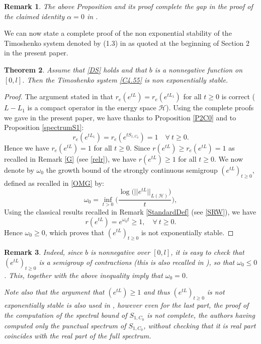 \documentclass[10pt, english]{article}
\newtheorem{thm}{Theorem}[section]
\newtheorem{oss}[thm]{Remark}
\begin{document}
{\begin{oss}\label{thmB}
The above Proposition and its proof complete the gap in the proof of the claimed identity $\alpha=0$ in \cite{SW2003}.
\end{oss}
We can now state a complete proof of the non exponential stability of the Timoshenko system denoted by (1.3) in \cite{SW2003} as quoted at the beginning of Section 2 in the present paper.
\begin{thm}\label{NES}
Assume that \eqref{DS} holds and that $b$ is a nonnegative function on $[0,l]$. Then the Timoshenko system \eqref{C4.55} is non exponentially stable.
\end{thm}
\begin{proof}
The argument stated in \cite{SW2003} that $r_e(e^{tL})=r_e(e^{tL_1})$ for all $t \geqslant 0$ is correct ($L-L_1$ is a compact operator in the energy space $\mathcal{H}$).
Using the complete proofs we gave in the present paper, we have thanks to Proposition \ref{P2C0} and to Proposition \ref{spectrumS1}:
$$
r_e(e^{tL_1})=r_e(e^{tS_{1,C_0}})=1 \quad \forall \ t \geqslant 0.
$$
Hence we have  $r_e(e^{tL})=1$ for all $ t \geqslant 0$. Since $r(e^{tL}) \geqslant r_e(e^{tL})=1$ as recalled in Remark \ref{G} (see \eqref{relr}), we have $r(e^{tL}) \geqslant 1$ for all $t \geqslant 0$.
We now denote by  $\omega_0$ the growth bound of the strongly continuous semigroup $(e^{tL})_{t \geqslant 0}$, defined as recalled in \eqref{OMG} by:
$$
\omega_0=\inf_{t>0}\Big(\dfrac{\log{\big(||e^{tL}||_{L(\mathcal{H})}\big)}}{t}\Big),
$$
Using the classical results recalled in Remark \ref{StandardDef} (see \eqref{SRW}), we have
$$
r(e^{tL})=e^{\omega_0 t} \geqslant 1, \quad \forall \ t \geqslant 0.
$$
Hence $\omega_0 \geqslant 0$, which proves that $(e^{tL})_{t \geqslant 0}$ is not exponentially stable.
\end{proof}
\begin{oss}\label{w0=0}
Indeed, since $b$ is nonnegative over $[0,l]$, it is easy to check that $(e^{tL})_{t \geqslant 0}$ is a semigroup of contractions (this is also recalled in \cite{SW2003}), so that $\omega_0 \leqslant 0$. This, together with the above inequality imply that $\omega_0 =0$.

Note also that the argument that $(e^{tL}) \geqslant 1$ and thus $(e^{tL})_{t \geqslant 0}$ is not exponentially stable is also used in \cite{SW2003}, however even for the last part, the proof of the computation of the spectral bound of $S_{1,C_0}$ is not complete, the authors having computed only the punctual spectrum of $S_{1,C_0}$, without checking that it is real part coincides with the real part of the full spectrum.
\end{oss}

}
\end{document}
